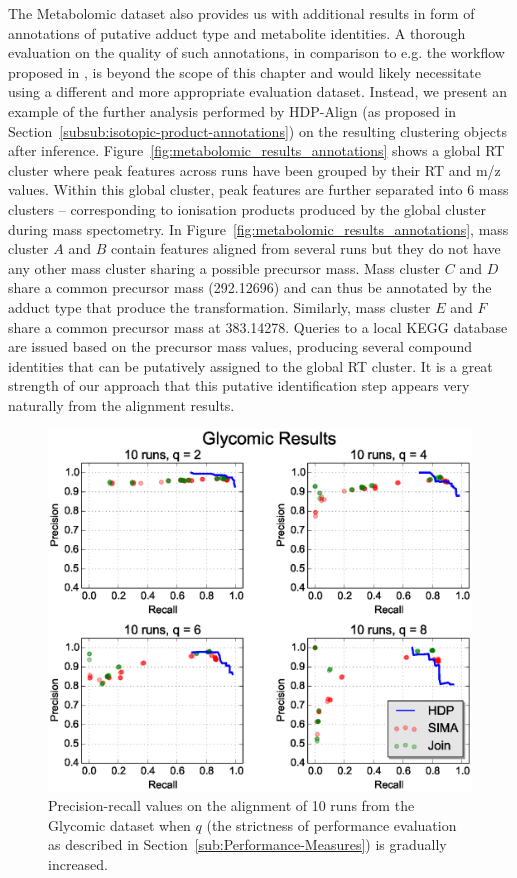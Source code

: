 The Metabolomic dataset also provides us with additional results in form of annotations of putative adduct type and metabolite identities. A thorough evaluation on the quality of such annotations, in comparison to e.g. the workflow proposed in \cite{Lee2013}, is beyond the scope of this chapter and would likely necessitate using a different and more appropriate evaluation dataset. Instead, we present an example of the further analysis performed by HDP-Align (as proposed in Section~\ref{subsub:isotopic-product-annotations}) on the resulting clustering objects after inference. Figure~\ref{fig:metabolomic_results_annotations} shows a global \ac{RT} cluster where peak features across runs have been grouped by their \ac{RT} and m/z values. Within this global cluster, peak features are further separated into 6 mass clusters -- corresponding to ionisation products produced by the global cluster during mass spectometry. In Figure~\ref{fig:metabolomic_results_annotations}, mass cluster $A$ and $B$ contain features aligned from several runs but they do not have any other mass cluster sharing a possible precursor mass. Mass cluster $C$ and $D$ share a common precursor mass (292.12696) and can thus be annotated by the adduct type that produce the transformation. Similarly, mass cluster $E$ and $F$ share a common precursor mass at 383.14278. Queries to a local KEGG database are issued based on the precursor mass values, producing several compound identities that can be putatively assigned to the global \ac{RT} cluster. It is a great strength of our approach that this putative identification step appears very naturally from the alignment results.

\begin{figure}[!htbp]
\centering\includegraphics[width=0.7\linewidth]{06-hdp/figures/figure_5.eps}
\centering\caption{\label{fig:glycomic_results}Precision-recall values on the alignment of 10 runs from the Glycomic dataset when $q$ (the strictness of performance evaluation as described in Section~\ref{sub:Performance-Measures}) is gradually increased.}
\end{figure}

